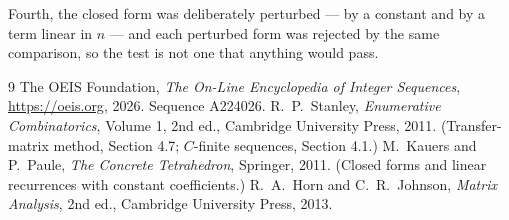 \documentclass[11pt,a4paper]{article}
\theoremstyle{plain}
\theoremstyle{definition}
\begin{document}
Fourth, the closed form was deliberately perturbed --- by a constant and by a term linear in
$n$ --- and each perturbed form was rejected by the same comparison, so the test is not one
that anything would pass.

\begin{thebibliography}{9}
 The OEIS Foundation, \emph{The On-Line Encyclopedia of Integer
Sequences}, \url{https://oeis.org}, 2026. Sequence A224026.
 R.~P.~Stanley, \emph{Enumerative Combinatorics}, Volume 1, 2nd ed.,
Cambridge University Press, 2011. (Transfer-matrix method, Section 4.7; $C$-finite sequences,
Section 4.1.)
 M.~Kauers and P.~Paule, \emph{The Concrete Tetrahedron}, Springer, 2011.
(Closed forms and linear recurrences with constant coefficients.)
 R.~A.~Horn and C.~R.~Johnson, \emph{Matrix Analysis}, 2nd ed., Cambridge
University Press, 2013.
\end{thebibliography}
\end{document}

